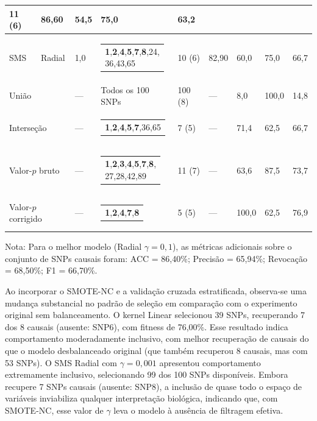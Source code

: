 \documentclass[12pt,a4paper]{article}
\makeatletter
\newcommand{\makecell}[2][t]{\begin{tabular}[#1]{@{}l@{}}#2\end{tabular}}
\newcommand{\novo}[1]{\textcolor{corNova}{#1}}
\makeatother
\begin{document}
\begin{longtable}{L{1.3cm}|L{1.3cm}|C{0.8cm}|L{4.8cm}|C{1.55cm}|C{0.95cm}|C{0.95cm}|C{0.9cm}|C{1.05cm}}
  \novo{11 (6)} & \novo{86,60} & \novo{54,5} & \novo{75,0} & \novo{63,2} \\
\hline
\novo{SMS} & \novo{Radial} & \novo{1,0} &
  \novo{\makecell[l]{\textbf{1},\textbf{2},\textbf{4},\textbf{5},\textbf{7},\textbf{8},24,\\
               36,43,65}} &
  \novo{10 (6)} & \novo{82,90} & \novo{60,0} & \novo{75,0} & \novo{66,7} \\
\hline
\multicolumn{2}{l|}{\novo{União}} & \novo{---} &
  \novo{Todos os 100 SNPs} &
  \novo{100 (8)} & \novo{---} & \novo{8,0} & \novo{100,0} & \novo{14,8} \\
\hline
\multicolumn{2}{l|}{\novo{Interseção}} & \novo{---} &
  \novo{\makecell[l]{\textbf{1},\textbf{2},\textbf{4},\textbf{5},\textbf{7},36,65}} &
  \novo{7 (5)} & \novo{---} & \novo{71,4} & \novo{62,5} & \novo{66,7} \\
\hline
\multicolumn{2}{l|}{\novo{Valor-$p$ bruto}} & \novo{---} &
  \novo{\makecell[l]{\textbf{1},\textbf{2},\textbf{3},\textbf{4},\textbf{5},\textbf{7},\textbf{8},\\
               27,28,42,89}} &
  \novo{11 (7)} & \novo{---} & \novo{63,6} & \novo{87,5} & \novo{73,7} \\
\hline
\multicolumn{2}{l|}{\novo{Valor-$p$ corrigido}} & \novo{---} &
  \novo{\makecell[l]{\textbf{1},\textbf{2},\textbf{4},\textbf{7},\textbf{8}}} &
  \novo{5 (5)} & \novo{---} & \novo{100,0} & \novo{62,5} & \novo{76,9} \\
\hline
\end{longtable}





\novo{Nota: Para o melhor modelo (Radial $\gamma = 0{,}1$), as métricas adicionais sobre o conjunto de SNPs causais foram: ACC = 86,40\%; Precisão = 65,94\%; Revocação = 68,50\%; F1 = 66,70\%.}

\novo{Ao incorporar o SMOTE-NC e a validação cruzada estratificada, observa-se uma mudança substancial no padrão de seleção em comparação com o experimento original sem balanceamento. O kernel Linear selecionou 39 SNPs, recuperando 7 dos 8 causais (ausente: SNP6), com fitness de 76,00\%. Esse resultado indica comportamento moderadamente inclusivo, com melhor recuperação de causais do que o modelo desbalanceado original (que também recuperou 8 causais, mas com 53 SNPs). O SMS Radial com $\gamma = 0{,}001$ apresentou comportamento extremamente inclusivo, selecionando 99 dos 100 SNPs disponíveis. Embora recupere 7 SNPs causais (ausente: SNP8), a inclusão de quase todo o espaço de variáveis inviabiliza qualquer interpretação biológica, indicando que, com SMOTE-NC, esse valor de $\gamma$ leva o modelo à ausência de filtragem efetiva.}
\end{document}
